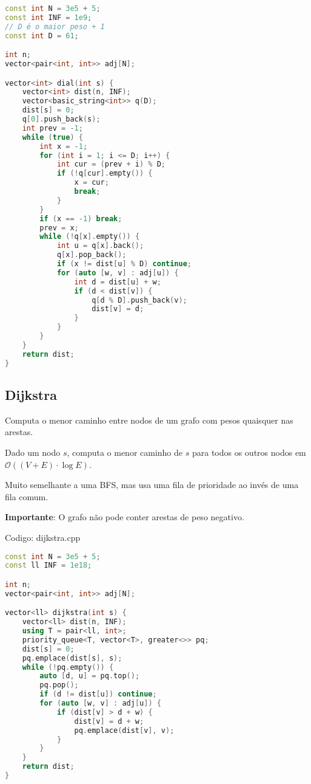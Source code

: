 \documentclass[10pt, a4paper, oneside]{book}
\begin{document}
\begin{lstlisting}[language=C++]
const int N = 3e5 + 5;
const int INF = 1e9;
// D é o maior peso + 1
const int D = 61;

int n;
vector<pair<int, int>> adj[N];

vector<int> dial(int s) {
    vector<int> dist(n, INF);
    vector<basic_string<int>> q(D);
    dist[s] = 0;
    q[0].push_back(s);
    int prev = -1;
    while (true) {
        int x = -1;
        for (int i = 1; i <= D; i++) {
            int cur = (prev + i) % D;
            if (!q[cur].empty()) {
                x = cur;
                break;
            }
        }
        if (x == -1) break;
        prev = x;
        while (!q[x].empty()) {
            int u = q[x].back();
            q[x].pop_back();
            if (x != dist[u] % D) continue;
            for (auto [w, v] : adj[u]) {
                int d = dist[u] + w;
                if (d < dist[v]) {
                    q[d % D].push_back(v);
                    dist[v] = d;
                }
            }
        }
    }
    return dist;
}
\end{lstlisting}
\hfill

\subsection{Dijkstra}


Computa o menor caminho entre nodos de um grafo com pesos quaisquer nas arestas.



Dado um nodo $s$, computa o menor caminho de $s$ para todos os outros nodos em $\mathcal{O}((V + E) \cdot \log E)$.



Muito semelhante a uma BFS, mas usa uma fila de prioridade ao invés de uma fila comum.



\textbf{Importante}: O grafo não pode conter arestas de peso negativo.
\hfill

Codigo: dijkstra.cpp

\begin{lstlisting}[language=C++]
const int N = 3e5 + 5;
const ll INF = 1e18;

int n;
vector<pair<int, int>> adj[N];

vector<ll> dijkstra(int s) {
    vector<ll> dist(n, INF);
    using T = pair<ll, int>;
    priority_queue<T, vector<T>, greater<>> pq;
    dist[s] = 0;
    pq.emplace(dist[s], s);
    while (!pq.empty()) {
        auto [d, u] = pq.top();
        pq.pop();
        if (d != dist[u]) continue;
        for (auto [w, v] : adj[u]) {
            if (dist[v] > d + w) {
                dist[v] = d + w;
                pq.emplace(dist[v], v);
            }
        }
    }
    return dist;
}
\end{lstlisting}
\hfill
\end{document}

